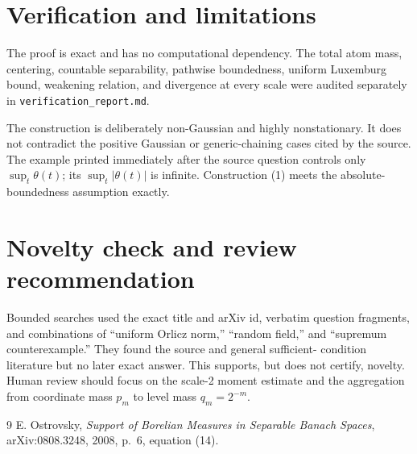 \documentclass[11pt]{article}
\begin{document}
\section*{Verification and limitations}
The proof is exact and has no computational dependency. The total atom mass,
centering, countable separability, pathwise boundedness, uniform Luxemburg
bound, weakening relation, and divergence at every scale were audited
separately in \texttt{verification\_report.md}.

The construction is deliberately non-Gaussian and highly nonstationary. It
does not contradict the positive Gaussian or generic-chaining cases cited by
the source. The example printed immediately after the source question controls
only $\sup_t\theta(t)$; its $\sup_t|\theta(t)|$ is infinite. Construction (1)
meets the absolute-boundedness assumption exactly.

\section*{Novelty check and review recommendation}
Bounded searches used the exact title and arXiv id, verbatim question
fragments, and combinations of ``uniform Orlicz norm,'' ``random field,'' and
``supremum counterexample.'' They found the source and general sufficient-
condition literature but no later exact answer. This supports, but does not
certify, novelty. Human review should focus on the scale-2 moment estimate and
the aggregation from coordinate mass $p_m$ to level mass $q_m=2^{-m}$.

\begin{thebibliography}{9}
E. Ostrovsky,
\emph{Support of Borelian Measures in Separable Banach Spaces},
arXiv:0808.3248, 2008, p.~6, equation (14).
\end{thebibliography}
\end{document}
